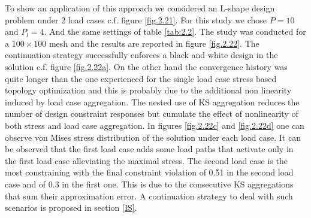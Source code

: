 To show an application of this approach we considered an L-shape design problem under 2 load cases c.f. figure \ref{fig.2.21}.
For this study we chose $P=10$ and $P_l=4$. And the same settings of table \ref{tab:2.2}. The study was conducted for a $100\times100$ mesh and the results are reported in figure \ref{fig.2.22}. The continuation strategy successfully enforces a black and white design in the solution c.f. figure \ref{fig.2.22a}. On the other hand the convergence history was quite longer than the one experienced for the single load case stress based topology optimization and this is probably due to the additional non linearity induced by load case aggregation. The nested use of KS aggregation reduces the number of design constraint responses but cumulate the effect of nonlinearity of both stress and load case aggregation. In figures \ref{fig.2.22c}  and \ref{fig.2.22d} one can observe von Mises stress distribution of the solution under each load case. It can be observed that the first load case adds some load paths that activate only in the first load case alleviating the maximal stress.
The second load case is the most constraining with the final constraint violation of 0.51 in the second load case and of 0.3 in the first one. This is due to the consecutive KS aggregations that sum their approximation error. A continuation strategy to deal with such scenarios is proposed in section \ref{IS}.


